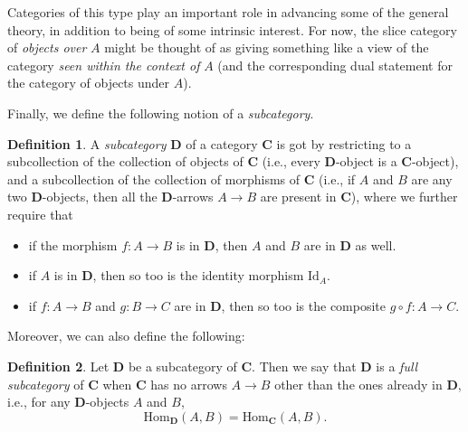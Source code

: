 \documentclass[11pt]{book}
\theoremstyle{definition}
\theoremstyle{definition}
\newtheorem{definition}{Definition}[section]
\theoremstyle{definition}
\theoremstyle{theorem}
\theoremstyle{definition}
\begin{document}
	Categories of this type play an important role in advancing some of the general theory, in addition to being of some intrinsic interest. For now, the slice category of \textit{objects over} $A$ might be thought of as giving something like a view of the category \textit{seen within the context of} $A$ (and the corresponding dual statement for the category of objects under $A$). \par  
Finally, we define the following notion of a \textit{subcategory}. 
\begin{definition}
	A \textit{subcategory}  $\textbf{D}$ of a category $\textbf{C}$ is got by restricting to a subcollection of the collection of objects of $\textbf{C}$ (i.e., every $\textbf{D}$-object is a $\textbf{C}$-object), and a subcollection of the collection of morphisms of $\textbf{C}$ (i.e., if $A$ and $B$ are any two $\textbf{D}$-objects, then all the $\textbf{D}$-arrows $A \rightarrow B$ are present in $\textbf{C}$), where we further require that
	\begin{itemize}
		\item if the morphism $f: A \rightarrow B$ is in $\textbf{D}$, then $A$ and $B$ are in $\textbf{D}$ as well. 
		\item if $A$ is in $\textbf{D}$, then so too is the identity morphism $\text{Id}_A$. 
		\item if $f: A \rightarrow B$ and $g: B \rightarrow C$ are in $\textbf{D}$, then so too is the composite $g \circ f: A \rightarrow C$. 
	\end{itemize}
\end{definition} \noindent 
Moreover, we can also define the following: 
\begin{definition}
	Let $\textbf{D}$ be a subcategory of $\textbf{C}$. Then we say that $\textbf{D}$ is a \textit{full subcategory}  of $\textbf{C}$ when $\textbf{C}$ has no arrows $A \rightarrow B$ other than the ones already in $\textbf{D}$, i.e., for any $\textbf{D}$-objects $A$ and $B$, 
	\begin{equation*}
	\text{Hom}_{\textbf{D}}(A, B) = \text{Hom}_{\textbf{C}}(A, B).
	\end{equation*}
\end{definition}
\end{document}
